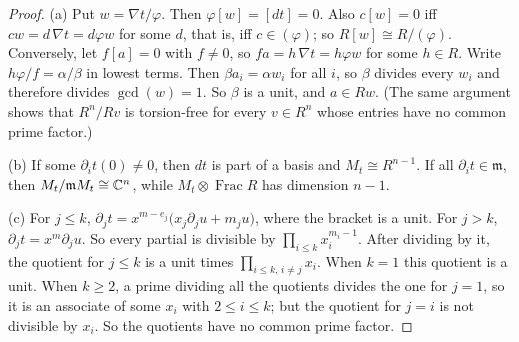 \begin{proof}
(a) Put $w=\nabla t/\varphi$. Then $\varphi[w]=[dt]=0$. Also $c[w]=0$ iff $cw=d\,\nabla t=d\varphi w$ for some $d$, that is, iff $c\in(\varphi)$; so $R[w]\cong R/(\varphi)$. Conversely, let $f[a]=0$ with $f\neq0$, so $fa=h\,\nabla t=h\varphi w$ for some $h\in R$. Write $h\varphi/f=\alpha/\beta$ in lowest terms. Then $\beta a_i=\alpha w_i$ for all $i$, so $\beta$ divides every $w_i$ and therefore divides $\gcd(w)=1$. So $\beta$ is a unit, and $a\in Rw$. (The same argument shows that $R^n/Rv$ is torsion-free for every $v\in R^n$ whose entries have no common prime factor.)

(b) If some $\partial_it(0)\neq0$, then $dt$ is part of a basis and $M_t\cong R^{n-1}$. If all $\partial_it\in\mathfrak m$, then $M_t/\mathfrak mM_t\cong\mathbb{C}^n$, while $M_t\otimes\operatorname{Frac}R$ has dimension $n-1$.

(c) For $j\le k$, $\partial_jt=x^{m-e_j}\bigl(x_j\partial_ju+m_ju\bigr)$, where the bracket is a unit. For $j>k$, $\partial_jt=x^m\partial_ju$. So every partial is divisible by $\prod_{i\le k}x_i^{m_i-1}$. After dividing by it, the quotient for $j\le k$ is a unit times $\prod_{i\le k,\,i\ne j}x_i$. When $k=1$ this quotient is a unit. When $k\ge2$, a prime dividing all the quotients divides the one for $j=1$, so it is an associate of some $x_i$ with $2\le i\le k$; but the quotient for $j=i$ is not divisible by $x_i$. So the quotients have no common prime factor.


\end{proof}
